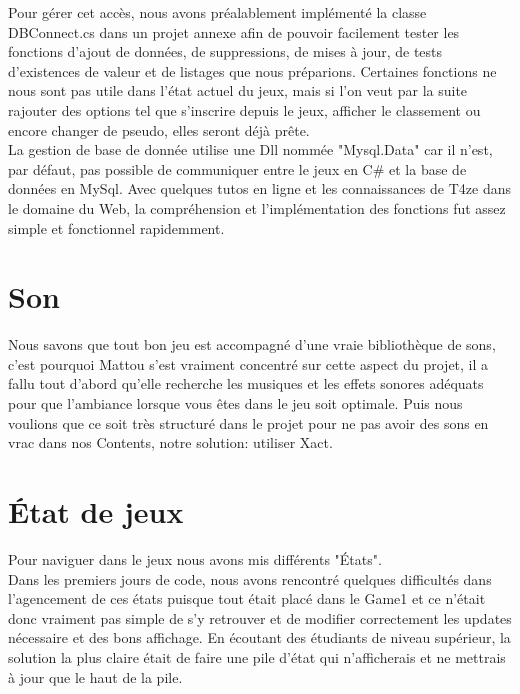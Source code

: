 \documentclass [11pt]{report}
\begin{document}
	Pour gérer cet accès, nous avons préalablement implémenté la classe DBConnect.cs dans un projet annexe afin de pouvoir facilement tester les fonctions d'ajout de données, de suppressions, de mises à jour, de tests d'existences de valeur et de listages que nous préparions. Certaines fonctions ne nous sont pas utile dans l'état actuel du jeux, mais si l'on veut par la suite rajouter des options tel que s'inscrire depuis le jeux, afficher le classement ou encore changer de pseudo, elles seront déjà prête.\\
	
	La gestion de base de donnée utilise une Dll nommée "Mysql.Data" car il n'est, par défaut, pas possible de communiquer entre le jeux en C\# et la base de données en MySql. 
	Avec quelques tutos en ligne et les connaissances de T4ze dans le domaine du Web, la compréhension et l'implémentation des fonctions fut assez simple et fonctionnel rapidemment.
	
	
	\vspace{10mm}


	\section{Son}
	Nous savons que tout bon jeu est accompagné d'une vraie bibliothèque de sons, c'est pourquoi Mattou s'est vraiment concentré sur cette aspect du projet, il a fallu tout d'abord qu'elle recherche les musiques et les effets sonores adéquats pour que l'ambiance lorsque vous êtes dans le jeu soit optimale. Puis nous voulions que ce soit très structuré dans le projet pour ne pas avoir des sons en vrac dans nos Contents, notre solution: utiliser Xact. 
	
	
	\vspace{10mm}
	
	
	\section{\'Etat de jeux}
	Pour naviguer dans le jeux nous avons mis différents "États". \\
	
	Dans les premiers jours de code, nous avons rencontré quelques difficultés dans l'agencement de ces états puisque tout était placé dans le Game1 et ce n'était donc vraiment pas simple de s'y retrouver et de modifier correctement les updates nécessaire et des bons affichage. En écoutant des étudiants de niveau supérieur, la solution la plus claire était de faire une pile d'état qui n'afficherais et ne mettrais à jour que le haut de la pile.
	
\end{document}
